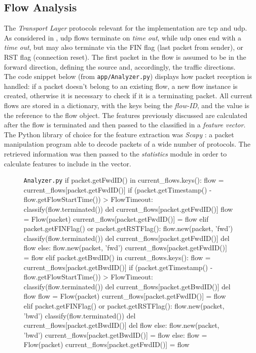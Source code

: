 \subsection{Flow Analysis}
\label{subsec:flow-analysis}

The \textit{Transport Layer} protocols relevant for the implementation are \gls{tcp} and \gls{udp}. As considered in \cite{Mozley2020}, \gls{udp} flows terminate on \textit{time out}, while \gls{udp} ones end with a \textit{time out}, but may also terminate via the FIN flag (last packet from sender), or RST flag (connection reset). The first packet in the flow is assumed to be in the forward direction, defining the source and, accordingly, the traffic directions. \\ The code snippet below (from \texttt{app/Analyzer.py}) displays how packet reception is handled: if a packet doesn't belong to an existing flow, a new flow instance is created, otherwise it is necessary to check if it is a terminating packet. All current flows are stored in a dictionary, with the keys being the \textit{flow-ID}, and the value is the reference to the flow object. The features previously discussed are calculated after the flow is terminated and then passed to the classified in a \textit{feature vector}. The Python library of choice for the feature extraction was \textit{Scapy} \cite{ScapyLibrary}: a packet manipulation program able to decode packets of a wide number of protocols. The retrieved information was then passed to the \textit{statistics} module in order to calculate features to include in the vector.

\begin{figure}[h!]
    \begin{code}[colback=white]{\texttt{Analyzer.py}}
if packet.getFwdID() in current_flows.keys():
  flow = current_flows[packet.getFwdID()]
  if (packet.getTimestamp() - flow.getFlowStartTime()) > FlowTimeout:
    classify(flow.terminated())
    del current_flows[packet.getFwdID()]
    flow = Flow(packet)
    current_flows[packet.getFwdID()] = flow
  elif packet.getFINFlag() or packet.getRSTFlag():
    flow.new(packet, 'fwd')
    classify(flow.terminated())
    del current_flows[packet.getFwdID()]
    del flow
  else:
    flow.new(packet, 'fwd')
    current_flows[packet.getFwdID()] = flow
elif packet.getBwdID() in current_flows.keys():
  flow = current_flows[packet.getBwdID()]
  if (packet.getTimestamp() - flow.getFlowStartTime()) > FlowTimeout:
    classify(flow.terminated())
    del current_flows[packet.getBwdID()]
    del flow
    flow = Flow(packet)
    current_flows[packet.getFwdID()] = flow
  elif packet.getFINFlag() or packet.getRSTFlag():
    flow.new(packet, 'bwd')
    classify(flow.terminated())
    del current_flows[packet.getBwdID()]
    del flow
  else:
    flow.new(packet, 'bwd')
    current_flows[packet.getBwdID()] = flow
else:
  flow = Flow(packet)
  current_flows[packet.getFwdID()] = flow
\end{code}
\end{figure}



